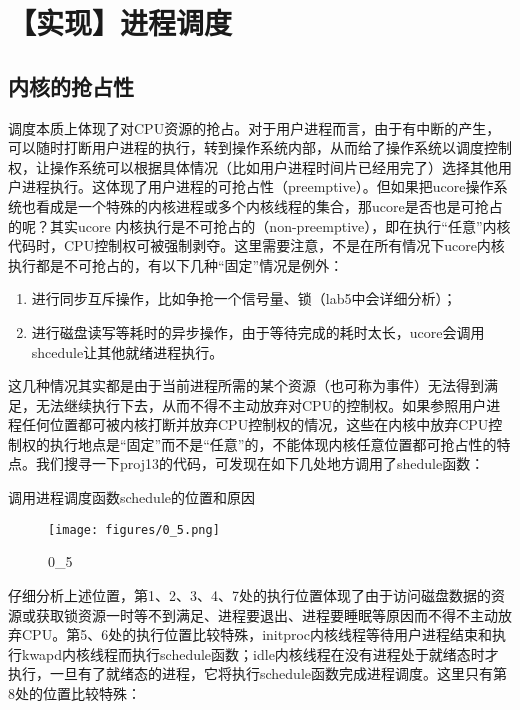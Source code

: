 \section{【实现】进程调度}\label{ux5b9eux73b0ux8fdbux7a0bux8c03ux5ea6}

\subsection{内核的抢占性}\label{ux5185ux6838ux7684ux62a2ux5360ux6027}

调度本质上体现了对CPU资源的抢占。对于用户进程而言，由于有中断的产生，可以随时打断用户进程的执行，转到操作系统内部，从而给了操作系统以调度控制权，让操作系统可以根据具体情况（比如用户进程时间片已经用完了）选择其他用户进程执行。这体现了用户进程的可抢占性（preemptive）。但如果把ucore操作系统也看成是一个特殊的内核进程或多个内核线程的集合，那ucore是否也是可抢占的呢？其实ucore
内核执行是不可抢占的（non-preemptive），即在执行``任意''内核代码时，CPU控制权可被强制剥夺。这里需要注意，不是在所有情况下ucore内核执行都是不可抢占的，有以下几种``固定''情况是例外：

\begin{enumerate}
\def\labelenumi{\arabic{enumi}.}
\tightlist
\item
  进行同步互斥操作，比如争抢一个信号量、锁（lab5中会详细分析）；
\item
  进行磁盘读写等耗时的异步操作，由于等待完成的耗时太长，ucore会调用shcedule让其他就绪进程执行。
\end{enumerate}

这几种情况其实都是由于当前进程所需的某个资源（也可称为事件）无法得到满足，无法继续执行下去，从而不得不主动放弃对CPU的控制权。如果参照用户进程任何位置都可被内核打断并放弃CPU控制权的情况，这些在内核中放弃CPU控制权的执行地点是``固定''而不是``任意''的，不能体现内核任意位置都可抢占性的特点。我们搜寻一下proj13的代码，可发现在如下几处地方调用了shedule函数：

调用进程调度函数schedule的位置和原因

\begin{figure}[htbp]
\centering
\texttt{[image: figures/0\_5.png]}
\caption{0\_5}
\end{figure}

仔细分析上述位置，第1、2、3、4、7处的执行位置体现了由于访问磁盘数据的资源或获取锁资源一时等不到满足、进程要退出、进程要睡眠等原因而不得不主动放弃CPU。第5、6处的执行位置比较特殊，initproc内核线程等待用户进程结束和执行kwapd内核线程而执行schedule函数；idle内核线程在没有进程处于就绪态时才执行，一旦有了就绪态的进程，它将执行schedule函数完成进程调度。这里只有第8处的位置比较特殊：

